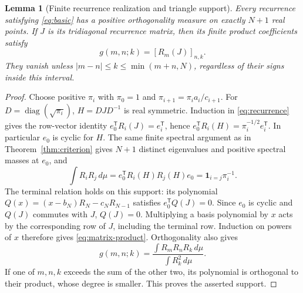 \documentclass[11pt]{article}
\newtheorem{lemma}[theorem]{Lemma}
\begin{document}
\begin{lemma}[Finite recurrence realization and triangle support]\label{lem:finite}
Every recurrence satisfying \eqref{eq:basic} has a positive orthogonality measure on exactly $N+1$ real points. If $J$ is its tridiagonal recurrence matrix, then its finite product coefficients satisfy
\begin{equation}\label{eq:matrix-product}
g(m,n;k)=[R_m(J)]_{n,k}.
\end{equation}
They vanish unless $|m-n|\leq k\leq\min(m+n,N)$, regardless of their signs inside this interval.
\end{lemma}
\begin{proof}
Choose positive $\pi_i$ with $\pi_0=1$ and $\pi_{i+1}=\pi_i a_i/c_{i+1}$. For $D=\operatorname{diag}(\sqrt{\pi_i})$, $H=DJD^{-1}$ is real symmetric. Induction in \eqref{eq:recurrence} gives the row-vector identity $e_0^\mathsf T R_i(J)=e_i^\mathsf T$, hence $e_0^\mathsf T R_i(H)=\pi_i^{-1/2}e_i^\mathsf T$. In particular $e_0$ is cyclic for $H$. The same finite spectral argument as in Theorem~\ref{thm:criterion} gives $N+1$ distinct eigenvalues and positive spectral masses at $e_0$, and
\[
\int R_iR_j\,d\mu=e_0^\mathsf TR_i(H)R_j(H)e_0
=\boldsymbol1_{i=j}\pi_i^{-1}.
\]
The terminal relation holds on this support: its polynomial $Q(x)=(x-b_N)R_N-c_NR_{N-1}$ satisfies $e_0^\mathsf TQ(J)=0$. Since $e_0$ is cyclic and $Q(J)$ commutes with $J$, $Q(J)=0$.
Multiplying a basis polynomial by $x$ acts by the corresponding row of $J$, including the terminal row. Induction on powers of $x$ therefore gives \eqref{eq:matrix-product}. Orthogonality also gives
\[
g(m,n;k)=\frac{\int R_mR_nR_k\,d\mu}{\int R_k^2\,d\mu}.
\]
If one of $m,n,k$ exceeds the sum of the other two, its polynomial is orthogonal to their product, whose degree is smaller. This proves the asserted support.
\end{proof}
\end{document}
